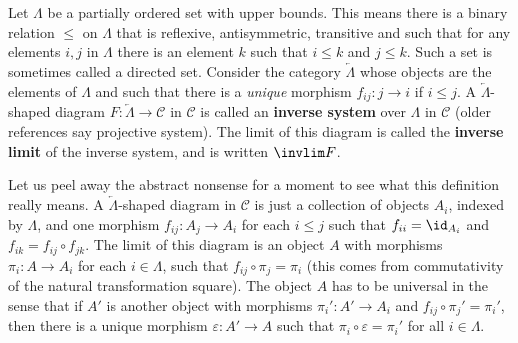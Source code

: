 \begin{example}
Let $\Lambda$ be a partially ordered set with upper bounds. This means there is a binary relation $\leq$ on $\Lambda$ that is reflexive, antisymmetric, transitive and such that for any elements $i,j$ in $\Lambda$ there is an element $k$ such that $i \leq k$ and $j \leq k$. Such a set is sometimes called a directed set. Consider the category $\underleftarrow\Lambda$ whose objects are the elements of $\Lambda$ and such that there is a \emph{unique} morphism $f_{ij} : j \rightarrow i$ if $i \leq j$. A $\underleftarrow\Lambda$-shaped diagram $F : \underleftarrow\Lambda \rightarrow \mathscr C$ in $\mathscr C$ is called an \textbf{inverse system} over $\Lambda$ in $\mathscr C$ (older references say projective system). The limit of this diagram is called the \textbf{inverse limit} of the inverse system, and is written $\invlim F$. 

Let us peel away the abstract nonsense for a moment to see what this definition really means. A $\underleftarrow\Lambda$-shaped diagram in $\mathscr C$ is just a collection of objects $A_i$, indexed by $\Lambda$, and one morphism $f_{ij} : A_j \rightarrow A_i$ for each $i \leq j$ such that $f_{ii} = \id_{A_i}$ and $f_{ik} = f_{ij} \circ f_{jk}$. The limit of this diagram is an object $A$ with morphisms $\pi_i : A \rightarrow A_i$ for each $i \in \Lambda$, such that $f_{ij} \circ \pi_j = \pi_i$ (this comes from commutativity of the natural transformation square). The object $A$ has to be universal in the sense that if $A'$ is another object with morphisms $\pi_i' : A' \rightarrow A_i$ and $f_{ij} \circ \pi_j' = \pi_i'$, then there is a unique morphism $\varepsilon : A' \rightarrow A$ such that $\pi_i \circ \varepsilon = \pi_i'$ for all $i \in \Lambda$. 
\end{example}

